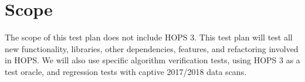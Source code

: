 \documentclass[notitlepage,letterpaper,pdftex,12pt,final]{article}
\numberwithin{equation}{section}
\begin{document}
\section{Scope}
\label{sec:scope}
The scope of this test plan does not include \acs{HOPS} 3. This test plan will test
all new functionality, libraries, other dependencies, features, and refactoring involved in
\acs{HOPS}. We will also use specific algorithm verification tests, using \acs{HOPS} 3 as a test
oracle, and regression tests with captive 2017/2018 data scans.



















\addtocounter{section}{1}
\renewcommand{\refname}{\thesection. References}
\printbibliography
\label{sec:references}


\label{page:LastPage}
\end{document}
